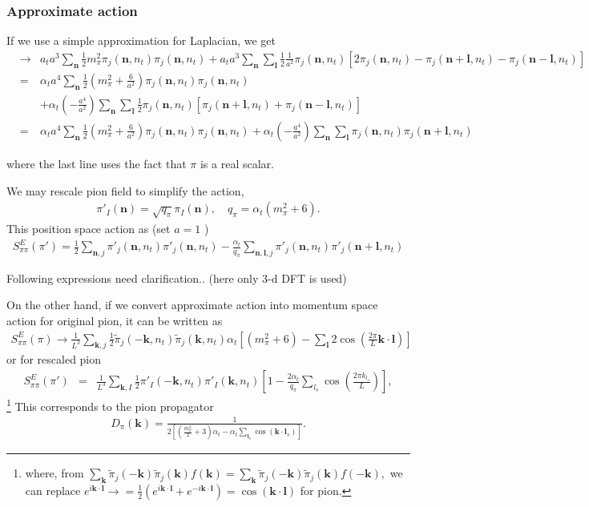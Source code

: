 \documentclass[10pt]{book}
\def\bm{\boldsymbol}
\newcommand{\bea}{\begin{eqnarray}}
\newcommand{\eea}{\end{eqnarray}}
\newcommand{\no}{\nonumber \\}
\def\vk{{\bm k}}
\def\vl{{\bm l}}
\def\vn{{\bm n}}
\begin{document}
\subsubsection{Approximate action} 
If we use a simple approximation for Laplacian, we get
\bea 
&\to& a_t a^3\sum_{\bm n} \frac{1}{2}m_\pi^2\pi_j({\bm n},n_t)\pi_j({\bm n},n_t)
     +a_t a^3\sum_{\bm n}\sum_{\bm l}\frac{1}{2}\frac{1}{a^2}
                   \pi_j({\bm n},n_t)[2\pi_j({\bm n},n_t)-\pi_j({\bm n}+{\bm l},n_t)-\pi_j({\bm n}-{\bm l},n_t)  ]
                   \no 
&=&  \alpha_t a^4\sum_{\bm n} \frac{1}{2}\left( m_\pi^2+\frac{6}{a^2}\right) 
         \pi_j({\bm n},n_t)\pi_j({\bm n},n_t) \no  & &
    +\alpha_t (-\frac{a^4}{a^2}) 
    \sum_{\bm n}\sum_{\bm l} \frac{1}{2}\pi_j({\bm n},n_t)
    [\pi_j({\bm n}+{\bm l},n_t)+\pi_j({\bm n}-{\bm l},n_t)  ]    \no     
&=& \alpha_t a^4\sum_{\bm n} \frac{1}{2}\left( m_\pi^2+\frac{6}{a^2}\right) 
\pi_j({\bm n},n_t)\pi_j({\bm n},n_t)
+\alpha_t (-\frac{a^4}{a^2}) 
\sum_{\bm n}\sum_{\bm l}\pi_j({\bm n},n_t)\pi_j({\bm n}+{\bm l},n_t)
\eea 

where the last line uses the fact that $\pi$ is a real scalar. 

We may rescale pion field to simplify the action,
\bea 
\pi'_I(\vn)=\sqrt{q_\pi} \pi_I(\vn), \quad q_\pi=\alpha_t(m_\pi^2+6).
\eea 
This position space action as (set $a=1$ )
\bea 
\boxed{ 
S_{\pi\pi}^E(\pi')=\frac{1}{2}\sum_{\vn,j}\pi'_j(\vn,n_t)\pi'_j(\vn,n_t) 
               -\frac{\alpha_t}{q_\pi}\sum_{\vn,\vl,j}\pi'_j(\vn,n_t)\pi'_j(\vn+\vl,n_t) 
               }
\eea 


{\color{red} Following expressions need clarification.. (here only 3-d DFT is used)}

On the other hand, if we convert approximate action into momentum space action 
for original pion, it can be written as
\bea
S_{\pi\pi}^E(\pi)\to \frac{1}{L^3} \sum_{\vk,j} \frac{1}{2}\tilde{\pi}_j(-\vk,n_t)\tilde{\pi}_j(\vk,n_t)
\alpha_t\left[  
(m_\pi^2+6)-\sum_{\vl} 2 \cos(\frac{2\pi}{L}\vk\cdot\vl)     \right] 
\eea 
or for rescaled pion
\bea 
S_{\pi\pi}^E(\pi')&=& \frac{1}{L^3} \sum_{\vk,I} \frac{1}{2}  
\pi'_I(-\vk,n_t)\pi'_I(\vk,n_t)\left[ 1
-\frac{2\alpha_t}{q_\pi}\sum_{l_s} \cos(\frac{2\pi k_{l_s}}{L})\right], 
\eea 
\footnote{ 
	where, from 
	$\sum_{\vk}\tilde{\pi}_j(-\vk)\tilde{\pi}_j(\vk) f(\vk)
	=\sum_{\vk}\tilde{\pi}_j(-\vk)\tilde{\pi}_j(\vk) f(-\vk),
	$
	we can replace $e^{i\vk\cdot\vl}\to =\frac{1}{2}(e^{i\vk\cdot\vl}+e^{-i\vk\cdot\vl})
	=\cos(\vk\cdot\vl)$ for pion. }
This corresponds to the pion propagator
\bea 
D_\pi(\vk)=\frac{1}{2\left[ (\frac{m_\pi^2}{2}+3)\alpha_t
	-\alpha_t\sum_{\vl_s} \cos(\vk\cdot\vl_s)\right]}.
\eea 
\end{document}
